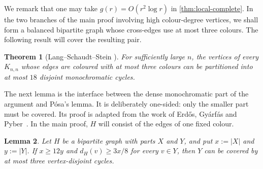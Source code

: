\documentclass[a4paper,12pt,reqno]{amsart}
\newtheorem{theorem}{Theorem}[section]
\newtheorem{lemma}[theorem]{Lemma}
\begin{document}
We remark that one may take $g(r)=O(r^2\log r)$ in \cref{thm:local-complete}. In
the two branches of the main proof involving high colour-degree vertices, we
shall form a balanced bipartite graph whose cross-edges use at most three
colours.  The following result will cover the resulting pair.

\begin{theorem}[Lang--Schaudt--Stein \cite{LangSchaudtStein2017}]
  \label{thm:three-colour-bipartite}
  For sufficiently large $n$, the vertices of every $K_{n,n}$ whose edges are
  coloured with at most three colours can be partitioned into at most $18$
  disjoint monochromatic cycles.
\end{theorem}

The next lemma is the interface between the dense monochromatic part of the
argument and P\'osa's lemma.  It is deliberately one-sided: only the smaller
part must be covered.
Its proof is adapted from the work of Erdős, Gyárfás and Pyber~\cite{ErdosGyarfasPyber1991}.
In the main proof, $H$ will consist of the edges of one
fixed colour.

\begin{lemma}\label{lem:dense-common}
  Let $H$ be a bipartite graph with parts $X$ and $Y$, and put
  $x:=|X|$ and $y:=|Y|$. If $x\ge12y$ and $d_H(v)\ge3x/8$ for every
  $v\in Y$, then $Y$ can be covered by at most three vertex-disjoint cycles.
\end{lemma}
\end{document}
